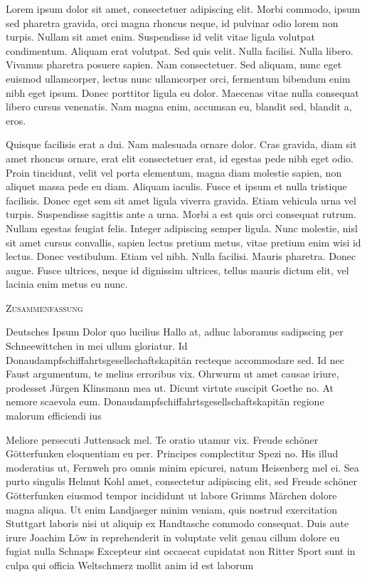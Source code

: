 Lorem ipsum dolor sit amet, consectetuer adipiscing elit. Morbi commodo, ipsum sed pharetra gravida, orci magna rhoncus neque, id pulvinar odio lorem non turpis. Nullam sit amet enim. Suspendisse id velit vitae ligula volutpat condimentum. Aliquam erat volutpat. Sed quis velit. Nulla facilisi. Nulla libero. Vivamus pharetra posuere sapien. Nam consectetuer. Sed aliquam, nunc eget euismod ullamcorper, lectus nunc ullamcorper orci, fermentum bibendum enim nibh eget ipsum. Donec porttitor ligula eu dolor. Maecenas vitae nulla consequat libero cursus venenatis. Nam magna enim, accumsan eu, blandit sed, blandit a, eros.

Quisque facilisis erat a dui. Nam malesuada ornare dolor. Cras gravida, diam sit amet rhoncus ornare, erat elit consectetuer erat, id egestas pede nibh eget odio. Proin tincidunt, velit vel porta elementum, magna diam molestie sapien, non aliquet massa pede eu diam. Aliquam iaculis. Fusce et ipsum et nulla tristique facilisis. Donec eget sem sit amet ligula viverra gravida. Etiam vehicula urna vel turpis. Suspendisse sagittis ante a urna. Morbi a est quis orci consequat rutrum. Nullam egestas feugiat felis. Integer adipiscing semper ligula. Nunc molestie, nisl sit amet cursus convallis, sapien lectus pretium metus, vitae pretium enim wisi id lectus. Donec vestibulum. Etiam vel nibh. Nulla facilisi. Mauris pharetra. Donec augue. Fusce ultrices, neque id dignissim ultrices, tellus mauris dictum elit, vel lacinia enim metus eu nunc.


\newpage
{}
\vspace*{20pt}
	\begin{center}
	\vspace*{100pt}
	\scshape {\Large Zusammenfassung} \\ \rm
	\end{center}

Deutsches Ipsum Dolor quo lucilius Hallo at, adhuc laboramus sadipscing per Schneewittchen in mei ullum gloriatur. Id Donaudampfschiffahrtsgesellschaftskapitän recteque accommodare sed. Id nec Faust argumentum, te melius erroribus vix. Ohrwurm ut amet causae iriure, prodesset Jürgen Klinsmann mea ut. Dicunt virtute suscipit Goethe no. At nemore scaevola eum. Donaudampfschiffahrtsgesellschaftskapitän regione malorum efficiendi ius

Meliore persecuti Juttensack mel. Te oratio utamur vix. Freude schöner Götterfunken eloquentiam eu per. Principes complectitur Spezi no. His illud moderatius ut, Fernweh pro omnis minim epicurei, natum Heisenberg mel ei. Sea purto singulis Helmut Kohl amet, consectetur adipiscing elit, sed Freude schöner Götterfunken eiusmod tempor incididunt ut labore Grimms Märchen dolore magna aliqua. Ut enim Landjaeger minim veniam, quis nostrud exercitation Stuttgart laboris nisi ut aliquip ex Handtasche commodo consequat. Duis aute irure Joachim Löw in reprehenderit in voluptate velit genau cillum dolore eu fugiat nulla Schnaps Excepteur sint occaecat cupidatat non Ritter Sport sunt in culpa qui officia Weltschmerz mollit anim id est laborum